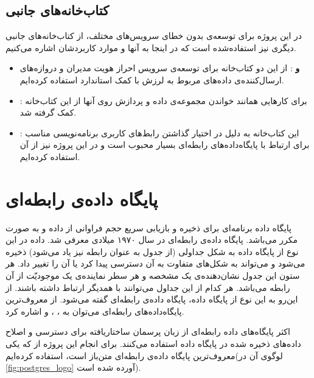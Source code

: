 \subsection{کتاب‌خانه‌‌های جانبی}
در این پروژه برای توسعه‌ی بدون خطای سرویس‌های مختلف، از کتاب‌خانه‌های جانبی دیگری نیز استفاده‌شده است که در اینجا به آنها و موارد کاربردشان اشاره می‌کنیم.
\begin{itemize}

\item \textbf{ و }: از این دو کتاب‌خانه برای توسعه‌ی سرویس احراز هویت مدیران و دروازه‌های ارسال‌کننده‌ی داده‌های مربوط به لرزش با کمک استاندارد  استفاده کرده‌ایم.

\item \textbf{}: برای کارهایی همانند خواندن مجموعه‌ی داده و پردازش روی آنها از این کتاب‌خانه کمک گرفته شد.

\item \textbf{}: این کتاب‌خانه به دلیل در اختیار گذاشتن رابط‌های کاربری برنامه‌نویسی مناسب برای ارتباط با پایگاه‌داده‌های رابطه‌ای بسیار محبوب است و در این پروژه نیز از آن استفاده کرده‌ایم.

\end{itemize}


\section{پایگاه داده‌ی رابطه‌ای}
پایگاه داده برنامه‌ای برای ذخیره و بازیابی سریع حجم فراوانی از داده و به صورت مکرر می‌باشد. پایگاه داده‌ی رابطه‌ای در سال ۱۹۷۰ میلادی معرفی شد. داده در این نوع از پایگاه داده به شکل جداولی (از جدول به عنوان رابطه نیز یاد می‌شود) ذخیره می‌شود و می‌تواند به شکل‌های متفاوت به آن دسترسی پیدا کرد یا آن را تغییر داد. هر ستون این جدول نشان‌دهنده‌ی یک مشخصه و هر سطر نماینده‌ی یک موجودیّت از آن رابطه می‌باشد. هر کدام از این جداول می‌توانند با همدیگر ارتباط داشته‌ باشند. از این‌رو به این نوع از پایگاه داده، پایگاه داده‌ی رابطه‌ای گفته می‌شود\cite{jatana2012survey}. از معروف‌ترین پایگاه‌داده‌های رابطه‌ای می‌توان به ، ،  و  اشاره کرد.

اکثر پایگاه‌های داده رابطه‌ای از زبان پرسمان ساختاریافته برای دسترسی و اصلاح داده‌های ذخیره شده در پایگاه داده استفاده می‌کنند. برای انجام این پروژه از \href{https://www.postgresql.org/}{} که یکی معروف‌ترین پایگاه‌ داده‌ی رابطه‌ای متن‌باز است، استفاده کرده‌ایم(لوگوی آن در \cref{fig:postgres_logo}\cite{postgresqlPostgreSQL} آورده شده است).

